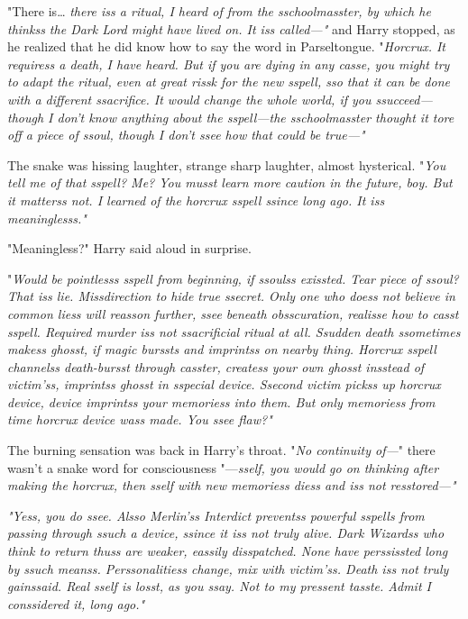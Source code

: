 "There is{\ldots} \emph{there iss a ritual, I heard of from the sschoolmasster, by which he thinkss the Dark Lord might have lived on. It iss called---"} and Harry stopped, as he realized that he did know how to say the word in Parseltongue. "\emph{Horcrux. It requiress a death, I have heard. But if you are dying in any casse, you might try to adapt the ritual, even at great rissk for the new sspell, sso that it can be done with a different ssacrifice. It would change the whole world, if you ssucceed---though I don't know anything about the sspell---the sschoolmasster thought it tore off a piece of ssoul, though I don't ssee how that could be true---"}

The snake was hissing laughter, strange sharp laughter, almost hysterical. "\emph{You tell me of that sspell? Me? You musst learn more caution in the future, boy. But it matterss not. I learned of the horcrux sspell ssince long ago. It iss meaninglesss."}

"Meaningless?" Harry said aloud in surprise.

"\emph{Would be pointlesss sspell from beginning, if ssoulss exissted. Tear piece of ssoul? That iss lie. Missdirection to hide true ssecret. Only one who doess not believe in common liess will reasson further, ssee beneath obsscuration, realisse how to casst sspell. Required murder iss not ssacrificial ritual at all. Ssudden death ssometimes makess ghosst, if magic burssts and imprintss on nearby thing. Horcrux sspell channelss death-bursst through casster, createss your own ghosst insstead of victim'ss, imprintss ghosst in sspecial device. Ssecond victim pickss up horcrux device, device imprintss your memoriess into them. But only memoriess from time horcrux device wass made. You ssee flaw?"}

The burning sensation was back in Harry's throat. "\emph{No continuity of---}" there wasn't a snake word for consciousness "---\emph{sself, you would go on thinking after making the horcrux, then sself with new memoriess diess and iss not resstored---"}

\emph{"Yess, you do ssee. Alsso Merlin'ss Interdict preventss powerful sspells from passing through ssuch a device, ssince it iss not truly alive. Dark Wizardss who think to return thuss are weaker, eassily disspatched. None have perssissted long by ssuch meanss. Perssonalitiess change, mix with victim'ss. Death iss not truly gainssaid. Real sself is losst, as you ssay. Not to my pressent tasste. Admit I conssidered it, long ago."}


